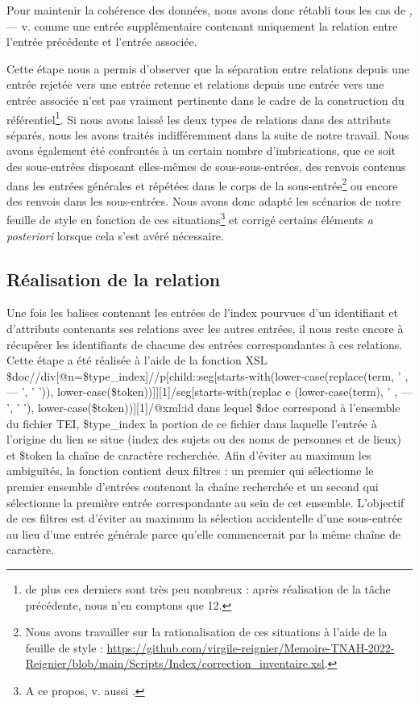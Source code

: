 \documentclass[a4paper,12pt,twoside]{book}
\begin{document}
	\noindent Pour maintenir la cohérence des données, nous avons donc rétabli tous les cas de \og{} , — v. \fg{} comme une entrée supplémentaire contenant uniquement la relation entre l'entrée précédente et l'entrée associée. 
	
	Cette étape nous a permis d'observer que la séparation entre relations depuis une entrée rejetée vers une entrée retenue et relations depuis une entrée vers une entrée associée n'est pas vraiment pertinente dans le cadre de la construction du référentiel\footnote{de plus ces derniers sont très peu nombreux : après réalisation de la tâche précédente, nous n'en comptons que 12.}. Si nous avons laissé les deux types de relations dans des attributs séparés, nous les avons traités indifféremment dans la suite de notre travail. Nous avons également été confrontés à un certain nombre d'imbrications, que ce soit des sous-entrées disposant elles-mêmes de sous-sous-entrées, des renvois contenus dans les entrées générales et répétées dans le corps de la sous-entrée\footnote{Nous avons travailler sur la rationalisation de ces situations à l'aide de la feuille de style : \url{https://github.com/virgile-reignier/Memoire-TNAH-2022-Reignier/blob/main/Scripts/Index/correction_inventaire.xsl}.} ou encore des renvois dans les sous-entrées. Nous avons donc adapté les scénarios de notre feuille de style en fonction de ces situations\footnote{A ce propos, v. aussi \cite{reignier_lindex_2022}.} et corrigé certains éléments \textit{a posteriori} lorsque cela s'est avéré nécessaire.
	
	\subsection{Réalisation de la relation}
	
	Une fois les balises contenant les entrées de l'index pourvues d'un identifiant et d'attributs contenants ses relations avec les autres entrées, il nous reste encore à récupérer les identifiants de chacune des entrées correspondantes à ces relations. Cette étape a été réalisée à l'aide de la fonction XSL \og \$doc//div[@n=\$type\_index]//p[child::seg[starts-with(lower-case(replace(term, ' , — ', ' ')), lower-case(\$token))]][1]/seg[starts-with(replac
	e (lower-case(term), ' , — ', ' '), lower-case(\$token))][1]/@xml:id\fg{} dans lequel \$doc correspond à l'ensemble du fichier TEI, \$type\_index la portion de ce fichier dans laquelle l'entrée à l'origine du lien se situe (index des sujets ou des noms de personnes et de lieux) et \$token la chaîne de caractère recherchée. Afin d'éviter au maximum les ambiguïtés, la fonction contient deux filtres : un premier qui sélectionne le premier ensemble d'entrées contenant la chaîne recherchée et un second qui sélectionne la première entrée correspondante au sein de cet ensemble. L'objectif de ces filtres est d'éviter au maximum la sélection accidentelle d'une sous-entrée au lieu d'une entrée générale parce qu'elle commencerait par la même chaîne de caractère.
	
\end{document}
